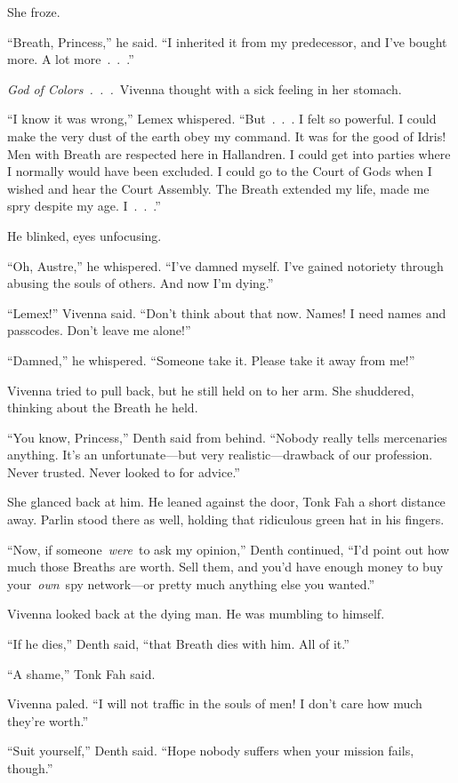 She froze.

“Breath, Princess,” he said. “I inherited it from my predecessor, and I’ve bought more. A lot more~.~.~.”

\textit{God of Colors~.~.~.}~Vivenna thought with a sick feeling in her stomach.

“I know it was wrong,” Lemex whispered. “But~.~.~. I felt so powerful. I could make the very dust of the earth obey my command. It was for the good of Idris! Men with Breath are respected here in Hallandren. I could get into parties where I normally would have been excluded. I could go to the Court of Gods when I wished and hear the Court Assembly. The Breath extended my life, made me spry despite my age. I~.~.~.”

He blinked, eyes unfocusing.

“Oh, Austre,” he whispered. “I’ve damned myself. I’ve gained notoriety through abusing the souls of others. And now I’m dying.”

“Lemex!” Vivenna said. “Don’t think about that now. Names! I need names and passcodes. Don’t leave me alone!”

“Damned,” he whispered. “Someone take it. Please take it away from me!”

Vivenna tried to pull back, but he still held on to her arm. She shuddered, thinking about the Breath he held.

“You know, Princess,” Denth said from behind. “Nobody really tells mercenaries anything. It’s an unfortunate—but very realistic—drawback of our profession. Never trusted. Never looked to for advice.”

She glanced back at him. He leaned against the door, Tonk Fah a short distance away. Parlin stood there as well, holding that ridiculous green hat in his fingers.

“Now, if someone~\textit{were}~to ask my opinion,” Denth continued, “I’d point out how much those Breaths are worth. Sell them, and you’d have enough money to buy your~\textit{own}~spy network—or pretty much anything else you wanted.”

Vivenna looked back at the dying man. He was mumbling to himself.

“If he dies,” Denth said, “that Breath dies with him. All of it.”

“A shame,” Tonk Fah said.

Vivenna paled. “I will not traffic in the souls of men! I don’t care how much they’re worth.”

“Suit yourself,” Denth said. “Hope nobody suffers when your mission fails, though.”

